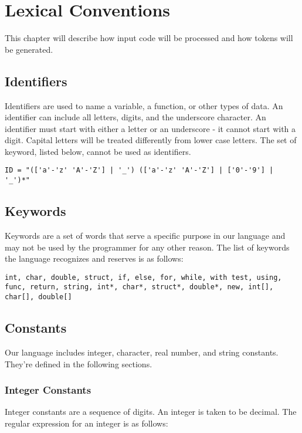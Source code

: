 \documentclass{article}
\begin{document}
\section{Lexical Conventions}
This chapter will describe how input code will be processed and how tokens will be generated.

\subsection{Identifiers}
Identifiers are used to name a variable, a function, or other types of data.  An identifier can include all letters, digits, and the underscore character.  An identifier must start with either a letter or an underscore - it cannot start with a digit.  Capital letters will be treated differently from lower case letters. The set of keyword, listed below, cannot be used as identifiers. 

\begin{Verbatim}[frame=single]
ID = "(['a'-'z' 'A'-'Z'] | '_') (['a'-'z' 'A'-'Z'] | ['0'-'9'] | '_')*"
\end{Verbatim}


\subsection{Keywords}
Keywords are a set of words that serve a specific purpose in our language and may not be used by the programmer for any other reason.  The list of keywords the language recognizes and reserves is as follows: 

\texttt{int, char, double, struct, if, else, for, while, with test, using, func, return, string, int*, char*, struct*, double*, new, int[], char[], double[]}

\subsection{Constants}
Our language includes integer, character, real number, and string constants. They're defined in the following sections.

\subsubsection{Integer Constants}
Integer constants are a sequence of digits. An integer is taken to be decimal. The regular expression for an integer is as follows:
\end{document}
